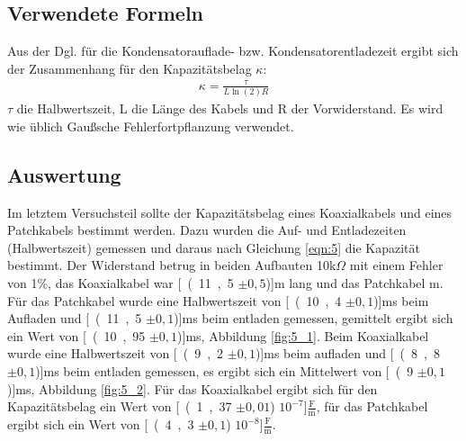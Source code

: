 \documentclass[12pt,a4paper]{article}
\begin{document}
\subsection{Verwendete Formeln}
Aus der Dgl. für die Kondensatorauflade- bzw. Kondensatorentladezeit ergibt sich der Zusammenhang für den Kapazitätsbelag $\kappa$:
\begin{align}
 \kappa = \frac{\tau}{L \ln(2) R}
 \label{eqn:5}
\end{align}
$\tau$ die Halbwertszeit, L die Länge des Kabels und R der Vorwiderstand. Es wird wie üblich Gaußsche Fehlerfortpflanzung verwendet.
\subsection{Auswertung}

Im letztem Versuchsteil sollte der Kapazitätsbelag eines Koaxialkabels und eines Patchkabels bestimmt werden.
Dazu wurden die Auf- und Entladezeiten (Halbwertszeit) gemessen und daraus nach Gleichung \ref{eqn:5} die Kapazität bestimmt.
Der Widerstand betrug in beiden Aufbauten 10k$\Omega$ mit einem Fehler von 1\%, das Koaxialkabel war \unit[(11,5 $\pm 0,5$)]{m} lang und das Patchkabel \unit[30]{m}. Für das Patchkabel wurde eine Halbwertszeit von \unit[(10,4 $\pm 0,1$)]{ms} beim Aufladen und \unit[(11,5 $\pm 0,1$)]{ms} beim entladen gemessen, gemittelt ergibt sich ein Wert von \unit[(10,95 $\pm 0,1$)]{ms}, Abbildung \ref{fig:5_1}. Beim Koaxialkabel wurde eine Halbwertszeit von \unit[(9,2 $\pm 0,1$)]{ms} beim aufladen und \unit[(8,8 $\pm 0,1$)]{ms} beim entladen gemessen, es ergibt sich ein Mittelwert von \unit[(9 $\pm 0,1$)]{ms}, Abbildung \ref{fig:5_2}.
Für das Koaxialkabel ergibt sich für den Kapazitätsbelag ein Wert von \unit[(1,37 $\pm 0,01$) $10^{-7}$]{$\frac{\text{F}}{\text{m}}$}, für das Patchkabel ergibt sich ein Wert von \unit[(4,3 $\pm 0,1$) $10^{-8}$]{$\frac{\text{F}}{\text{m}}$}.
\end{document}
